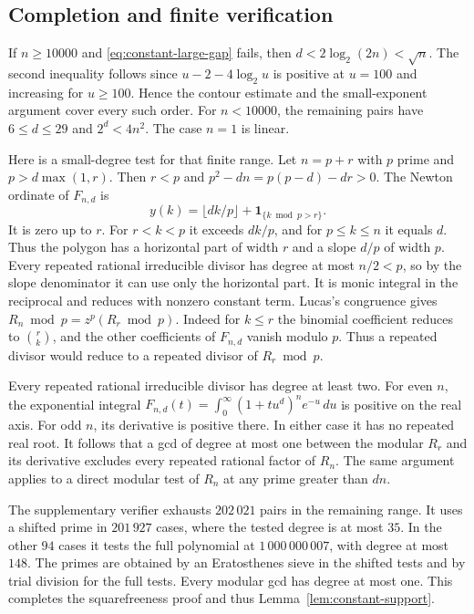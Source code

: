 \subsection{Completion and finite verification}

If \(n\ge10000\) and \eqref{eq:constant-large-gap} fails,
then \(d<2\log_2(2n)<\sqrt n\). The second inequality
follows since \(u-2-4\log_2 u\) is positive at \(u=100\)
and increasing for \(u\ge100\). Hence the contour estimate
and the small-exponent argument cover every such order.
For \(n<10000\), the remaining pairs have \(6\le d\le29\)
and \(2^d<4n^2\). The case \(n=1\) is linear.

Here is a small-degree test for that finite range.
Let \(n=p+r\) with \(p\) prime and \(p>d\max(1,r)\).
Then \(r<p\) and \(p^2-dn=p(p-d)-dr>0\).
The Newton ordinate of \(F_{n,d}\) is
\[
 y(k)=\lfloor dk/p\rfloor+\mathbf1_{\{k\bmod p>r\}}.
\]
It is zero up to \(r\). For \(r<k<p\) it exceeds \(dk/p\),
and for \(p\le k\le n\) it equals \(d\).
Thus the polygon has a horizontal part of width \(r\)
and a slope \(d/p\) of width \(p\).
Every repeated rational irreducible divisor has degree
at most \(n/2<p\), so by the slope denominator it can
use only the horizontal part. It is monic integral in
the reciprocal and reduces with nonzero constant term.
Lucas's congruence gives \(R_n\bmod p=z^p(R_r\bmod p)\).
Indeed for \(k\le r\) the binomial coefficient reduces
to \(\binom rk\), and the other coefficients of \(F_{n,d}\)
vanish modulo \(p\). Thus a repeated divisor would
reduce to a repeated divisor of \(R_r\bmod p\).

Every repeated rational irreducible divisor has degree
at least two. For even \(n\), the exponential integral
\(F_{n,d}(t)=\int_0^\infty(1+tu^d)^ne^{-u}\,du\) is positive
on the real axis. For odd \(n\), its derivative is positive there.
In either case it has no repeated real root.
It follows that a gcd of degree at most one between the modular
\(R_r\) and its derivative excludes every repeated rational
factor of \(R_n\). The same argument applies to a direct
modular test of \(R_n\) at any prime greater than \(dn\).

The supplementary verifier exhausts \(202\,021\) pairs in
the remaining range. It uses a shifted prime in \(201\,927\)
cases, where the tested degree is at most \(35\). In the
other \(94\) cases it tests the full polynomial at
\(1\,000\,000\,007\), with degree at most \(148\). The primes
are obtained by an Eratosthenes sieve in the shifted tests
and by trial division for the full tests. Every modular gcd
has degree at most one. This completes the squarefreeness
proof and thus Lemma~\ref{lem:constant-support}.
